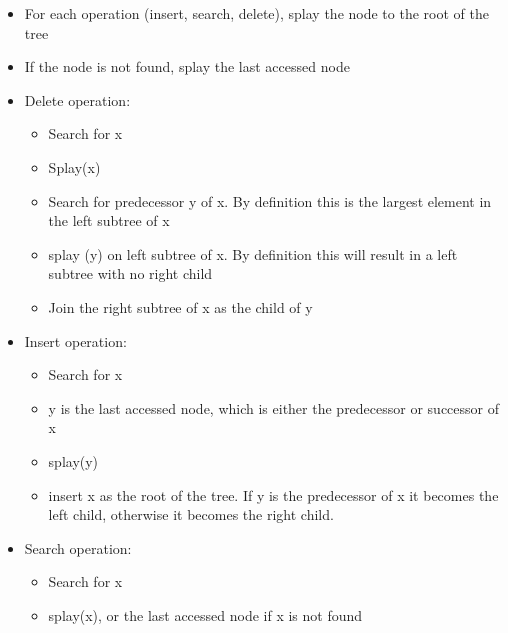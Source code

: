 \begin{itemize}
    \item For each operation (insert, search, delete), splay the node to the root of the tree
    \item If the node is not found, splay the last accessed node
    \item Delete operation:
        \begin{itemize}
            \item Search for x
            \item Splay(x)
            \item Search for predecessor y of x. By definition this is the largest element in the left subtree of x
            \item splay (y) on left subtree of x. By definition this will result in a left subtree with no right child
            \item Join the right subtree of x as the child of y
        \end{itemize}
    \item Insert operation:
        \begin{itemize}
            \item Search for x
            \item y is the last accessed node, which is either the predecessor or successor of x
            \item splay(y)
            \item insert x as the root of the tree. If y is the predecessor of x it becomes the left child, otherwise it becomes the right child.
        \end{itemize}
    \item Search operation:
        \begin{itemize}
            \item Search for x
            \item splay(x), or the last accessed node if x is not found
        \end{itemize}
\end{itemize}





